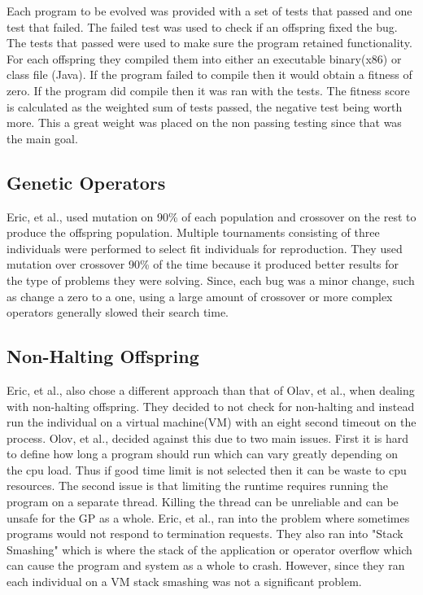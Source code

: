 \documentclass{sig-alternate}
\begin{document}
Each program to be evolved was provided with a set of tests that passed and one test that failed. The failed test was used to check if an offspring fixed the bug. The tests that passed were used to make sure the program retained functionality. For each offspring they compiled them into either an executable binary(x86) or class file (Java). If the program failed to compile then it would obtain a fitness of zero. If the program did compile then it was ran with the tests. The fitness score is calculated as the weighted sum of tests passed, the negative test being worth more. This a great weight was placed on the non passing testing since that was the main goal.

  

\subsection{Genetic Operators}
Eric, et al., used mutation on 90\% of each population and crossover on the rest to produce the offspring population. Multiple tournaments consisting of three individuals were performed to select fit individuals for reproduction. They used mutation over crossover 90\% of the time because it produced better results for the type of problems they were solving. Since, each bug was a minor change, such as change a zero to a one, using a large amount of crossover or more complex operators generally slowed their search time.  

\subsection{Non-Halting Offspring}

Eric, et al., also chose a different approach than that of Olav, et al., when dealing with non-halting offspring. They decided to not check for non-halting and instead run the individual on a virtual machine(VM) with an eight second timeout on the process. Olov, et al., decided against this due to two main issues. First it is hard to define how long a program should run which can vary greatly depending on the cpu load. Thus if good time limit is not selected then it can be waste to cpu resources. The second issue is that limiting the runtime requires running the program on a separate thread. Killing the thread can be unreliable and can be unsafe for the GP as a whole. Eric, et al., ran into the problem where sometimes programs would not respond to termination requests.
They also ran into "Stack Smashing" which is where the stack of the application or operator overflow which can cause the program and system as a whole to crash. However, since they ran each individual on a VM stack smashing was not a significant problem.
\end{document}
